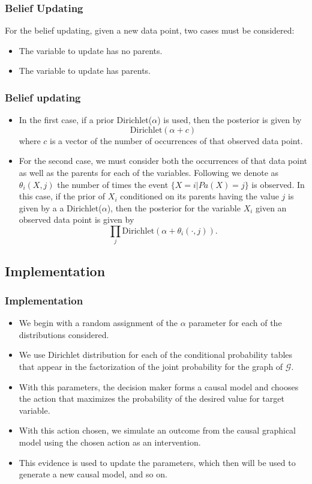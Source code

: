 \documentclass{beamer}
\theoremstyle{plain}
\begin{document}
\begin{frame}
\frametitle{Belief Updating}
For the belief updating, given a new data point,  two cases must be considered:
\begin{itemize}
\item The variable to update has no parents.
\item The variable to update has parents.
\end{itemize}
\end{frame}

\begin{frame}
\frametitle{Belief updating}
\begin{itemize}
\item In the first case, if a prior Dirichlet($\alpha$) is used, then the posterior is given by
\[ \textrm{Dirichlet}(\alpha + c) \]
where $c$ is a vector of the number of occurrences of that observed data point. 
\item For the second case, we must consider both the occurrences of that data point as well as the parents for each of the variables. Following \cite{barber2012bayesian} we denote as $\theta_i(X,j)$ the number of times the event $\{X=i | Pa(X)=j\}$ is observed. In this case, if the prior of $X_i$ conditioned on its parents having the value $j$ is given by a a Dirichlet($\alpha$), then the posterior for the variable $X_i$ given an observed data point is given by 
\[ \prod_j \textrm{Dirichlet}(\alpha + \theta_i(\cdot,j)). \]
\end{itemize}
\end{frame}

\subsection{Implementation}
\begin{frame}
\frametitle{Implementation}
\begin{itemize}
\item We begin with a random assignment of the $\alpha$ parameter for each of the distributions considered.
\item  We use Dirichlet distribution for each of the conditional probability tables that appear in the factorization of the joint probability for the graph of $\mathcal{G}$.
\item With this parameters, the decision maker forms a causal model and chooses the action that maximizes the probability of the desired value for target variable.
\item With this action chosen, we simulate an outcome from the causal graphical model using the chosen action as an intervention.
\item This evidence is used to update the parameters, which then will be used to generate a new causal model, and so on.
\end{itemize}
\end{frame}
\end{document}
